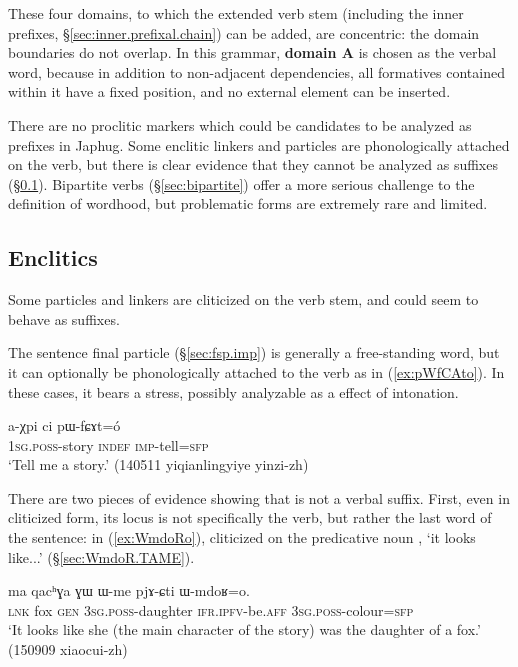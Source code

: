 These four domains, to which the extended verb stem (including the inner prefixes, §\ref{sec:inner.prefixal.chain}) can be added, are concentric: the domain boundaries do not overlap. In this grammar, \textbf{domain A} is chosen as the verbal word, because in addition to non-adjacent dependencies, all formatives contained within it have a fixed position, and no external element can be inserted. 

There are no proclitic markers which could be candidates to be analyzed as prefixes in Japhug. Some enclitic linkers and particles are phonologically attached on the verb, but there is clear evidence that they cannot be analyzed as suffixes (§\ref{sec:verb.enclitics}). Bipartite verbs (§\ref{sec:bipartite}) offer a more serious challenge to the definition of wordhood, but problematic forms are extremely rare and limited.

\subsection{Enclitics} \label{sec:verb.enclitics}
Some particles and linkers are cliticized on the verb stem, and could seem to behave as suffixes.

The sentence final particle  (§\ref{sec:fsp.imp}) is generally a free-standing word, but it can optionally be phonologically attached to the verb as in (\ref{ex:pWfCAto}). In these cases, it bears a stress, possibly analyzable as a effect of intonation.


\begin{exe}
\ex \label{ex:pWfCAto}
\gll a-χpi ci pɯ-fɕɤt=ó \\
\textsc{1sg}.\textsc{poss}-story \textsc{indef} \textsc{imp}-tell=\textsc{sfp} \\
\glt `Tell me a story.' (140511 yiqianlingyiye yinzi-zh) 	
\end{exe}

There are two pieces of evidence showing that  is not a verbal suffix. First, even in cliticized form, its locus is not specifically the verb, but rather the last word of the sentence: in (\ref{ex:WmdoRo}),  cliticized on the predicative noun   , `it looks like...' (§\ref{sec:WmdoR.TAME}).

\begin{exe}
\ex \label{ex:WmdoRo}
\gll ma qacʰɣa ɣɯ ɯ-me pjɤ-ɕti ɯ-mdoʁ=o. \\
\textsc{lnk} fox \textsc{gen} \textsc{3sg}.\textsc{poss}-daughter \textsc{ifr}.\textsc{ipfv}-be.\textsc{aff} \textsc{3sg}.\textsc{poss}-colour=\textsc{sfp} \\
\glt `It looks like she (the main character of the story) was the daughter of a fox.' (150909 xiaocui-zh) 
\end{exe}

